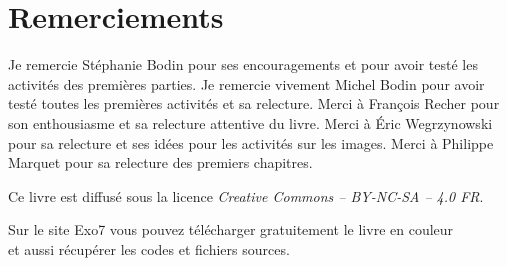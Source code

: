 
\clearemptydoublepage
\pagestyle{empty}\thispagestyle{empty}

\vspace*{\fill}

\section*{Remerciements}


Je remercie Stéphanie Bodin pour ses encouragements et pour avoir testé les activités des premières parties.
Je remercie vivement Michel Bodin pour avoir testé toutes les premières activités et sa relecture.
Merci à François Recher pour son enthousiasme et sa relecture attentive du livre. 
Merci à Éric Wegrzynowski pour sa relecture et ses idées pour les activités sur les images. 
Merci à Philippe Marquet pour sa relecture des premiers chapitres.




\vspace*{\fill}

\bigskip 

\begin{center}
\end{center}



\begin{center}
Ce livre est diffusé sous la licence \emph{Creative Commons -- BY-NC-SA -- 4.0 FR}.


Sur le site Exo7 vous pouvez télécharger gratuitement le livre en couleur\\
et aussi récupérer les codes et fichiers sources.

\end{center}




\printindex
{}

